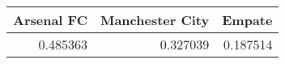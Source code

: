 \begin{tabular}{rrr}
\hline
   Arsenal FC &   Manchester City &   Empate \\
\hline
     0.485363 &          0.327039 & 0.187514 \\
\hline
\end{tabular}